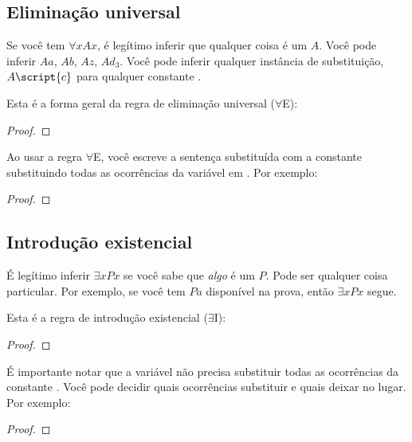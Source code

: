 \subsection{Eliminação universal}

Se você tem $\forall x Ax$, é legítimo inferir que qualquer coisa é um $A$. Você pode inferir $Aa$, $Ab$, $Az$, $Ad_3$. Você pode inferir qualquer instância de substituição, $A\script{c}$ para qualquer constante .

Esta é a forma geral da regra de eliminação universal ($\forall$E):

\begin{proof}
	 
\end{proof}

Ao usar a regra $\forall$E, você escreve a sentença substituída com a constante  substituindo todas as ocorrências da variável  em . Por exemplo:

\begin{proof}
	 
	 
\end{proof}


\subsection{Introdução existencial}

É legítimo inferir $\exists x Px$ se você sabe que \emph{algo} é um $P$. Pode ser qualquer coisa particular. Por exemplo, se você tem $Pa$ disponível na prova, então $\exists x Px$ segue.

Esta é a regra de introdução existencial ($\exists$I):

\begin{proof}
	 
\end{proof}

É importante notar que a variável  não precisa substituir todas as ocorrências da constante . Você pode decidir quais ocorrências substituir e quais deixar no lugar. Por exemplo:
\nopagebreak
\begin{proof}
	 
	 
	 
	 
	 
\end{proof}



